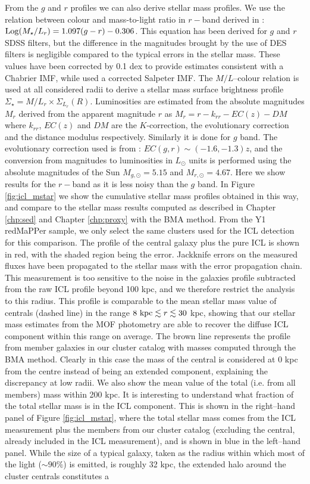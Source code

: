 {From the $g$ and $r$ profiles we can also derive stellar mass profiles. We use the relation between colour and mass-to-light ratio in $r-$band derived in \citet{bell}: ${\rm Log} (M_\star/L_r) = 1.097 (g - r) - 0.306$.  This equation has been derived for $g$ and $r$ SDSS filters, but the difference in the magnitudes brought by the use of DES filters is negligible compared to the typical errors in the stellar mass.  These values have been corrected by 0.1 dex to provide estimates consistent with a Chabrier IMF, while \citet{bell} used a corrected Salpeter IMF. The $M/L$--colour relation is used at all considered radii to derive a stellar mass surface brightness profile $\Sigma_\star=M/L_r \times \Sigma_{L_r}(R)$. Luminosities are estimated from the absolute magnitudes $M_r$ derived from the apparent magnitude $r$ as $M_r = r - k_{rr} -EC(z) -DM$ where $k_{rr}$, $EC(z)$ and $DM$ are the $K$-correction, the evolutionary correction and the distance modulus respectively. Similarly it is done for $g$ band. The evolutionary correction used is from \citet{bell}: $EC(g, r) \sim (-1.6, -1.3)z$, and the conversion from magnitudes to luminosities in $L_\odot$ units is performed using the absolute magnitudes of the Sun $M_{g,\odot} = 5.15$ and $M_{r,\odot} = 4.67$. Here we show results for the $r-$band as it is less noisy than the $g$ band. In Figure \ref{fig:icl_mstar} we show the cumulative stellar mass profiles obtained in this way, and compare to the stellar mass results computed as described in Chapter \ref{chp:sed} and Chapter \ref{chp:proxy} with the BMA method. From the Y1 redMaPPer sample, we only select the same clusters used for the ICL detection for this comparison. The profile of the central galaxy plus the pure ICL is shown in red, with the shaded region being the error. Jackknife errors on the measured fluxes have been propagated to the stellar mass with the error propagation chain. This measurement is too sensitive to the noise in the galaxies profile subtracted from the raw ICL profile beyond 100 kpc, and we therefore restrict the analysis to this radius. This profile is comparable to the mean stellar mass value of centrals (dashed line) in the range $8~{\rm kpc} \lesssim r \lesssim 30$ kpc, showing that our stellar mass estimates from the MOF photometry are able to recover the diffuse ICL component within this range on average. The brown line represents the profile from member galaxies in our cluster catalog with masses computed through the BMA method. Clearly in this case the mass of the central is considered at 0 kpc from the centre instead of being an extended component, explaining the discrepancy at low radii. We also show the mean value of the total (i.e. from all members) mass within 200 kpc. It is interesting to understand what fraction of the total stellar mass is in the ICL component. This is shown in the right--hand panel of Figure \ref{fig:icl_mstar}, where the total stellar mass comes from the ICL measurement plus the members from our cluster catalog (excluding the central, already included in the ICL measurement), and is shown in blue in the left--hand panel. While the size of a typical galaxy, taken as the radius within which most of the light ($\sim 90\%$) is emitted, is roughly 32 kpc, the extended halo around the cluster centrals constitutes a }
